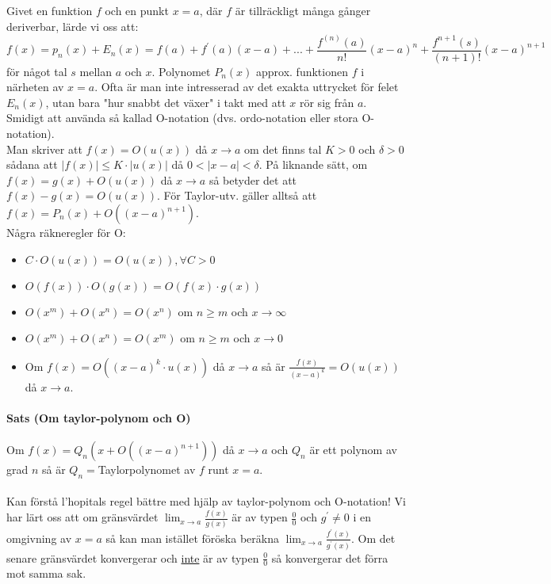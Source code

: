 Givet en funktion $f$ och en punkt $x=a$,
där $f$ är tillräckligt många gånger deriverbar, lärde vi oss att:
\begin{equation*}
    f(x)=p_n(x)+E_n(x)=f(a)+f^\prime(a)(x-a)+...+\frac{f^{(n)}(a)}{n!}(x-a)^n+\frac{f^{n+1}(s)}{(n+1)!}(x-a)^{n+1}
\end{equation*}
för något tal $s$ mellan $a$ och $x$.
Polynomet $P_n(x)$ approx. funktionen $f$ i närheten av $x=a$.
Ofta är man inte intresserad av det exakta uttrycket för felet $E_n(x)$,
utan bara "hur snabbt det växer" i takt med att $x$ rör sig från $a$.
Smidigt att använda så kallad O-notation (dvs. ordo-notation eller stora O-notation).\\
Man skriver att $f(x)=O(u(x))$ då $x\to a$ om det finns tal $K>0$ och $\delta>0$ sådana att $|f(x)|\leq K\cdot|u(x)|$ då $0< |x-a| <\delta$.
På liknande sätt, om $f(x)=g(x)+O(u(x))$ då $x\to a$ så betyder det att $f(x)-g(x)=O(u(x))$.
För Taylor-utv. gäller alltså att $f(x)=P_n(x)+O((x-a)^{n+1})$.\\
Några räkneregler för O:
\begin{itemize}
    \item $C\cdot O(u(x))=O(u(x)),\forall C>0$
    \item $O(f(x))\cdot O(g(x))=O(f(x)\cdot g(x))$
    \item $O(x^m)+O(x^n)=O(x^n)$ om $n\geq m$ och $x\to\infty$
    \item $O(x^m)+O(x^n)=O(x^m)$ om $n\geq m$ och $x\to 0$
    \item Om $f(x)=O((x-a)^k\cdot u(x))$ då $x\to a$ så är $\frac{f(x)}{(x-a)^k}=O(u(x))$ då $x\to a$.
\end{itemize}

\paragraph{Sats (Om taylor-polynom och O)}
Om $f(x)=Q_n(x+O((x-a)^{n+1}))$ då $x\to a$ och $Q_n$ är ett polynom av grad $n$ så är $Q_n=$Taylorpolynomet av $f$ runt $x=a$.
\\\\
Kan förstå l'hopitals regel bättre med hjälp av taylor-polynom och O-notation!
Vi har lärt oss att om gränsvärdet $\lim_{x\to a}\frac{f(x)}{g(x)}$ är av typen $\frac{0}{0}$ och $g^\prime\neq 0$ i en omgivning av $x=a$ så kan man istället föröska beräkna $\lim_{x\to a}\frac{f^\prime(x)}{g^\prime(x)}$.
Om det senare gränsvärdet konvergerar och \underline{inte} är av typen $\frac{0}{0}$ så konvergerar det förra mot samma sak.
